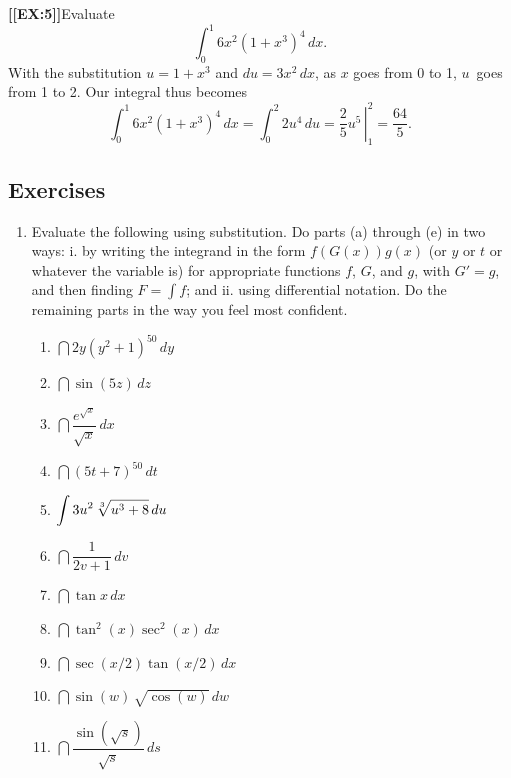 {\bf [[EX:5]]}\quad Evaluate
\[
\int_0^1 6 x^2(1+x^3)^4\,dx.
\]
With the substitution $u=1+x^3$ and $du=3x^2\,dx$, as $x$ goes from 0
to 1, $u$~goes from 1 to 2. Our integral thus becomes
\[
\int_0^1 6 x^2(1+x^3)^4\,dx=\int_0^2 2 u^4\,du
   =\left. \dfrac{2}{5}u^5 \, \right|_1^2 =\dfrac{64}{5}.
\]

\subsection{Exercises}
\label{subsec:exercises}




\begin{enumerate}
\item Evaluate the following using substitution.  Do parts (a) through
(e) in two ways: {\rm i.}  by writing the integrand in the form
$f(G(x))g(x)$ (or $y$ or $t$ or whatever the variable is) for
appropriate functions $f$, $G$, and $g$, with $G'=g$, and then finding
$F = \int f$; and {\rm ii.} using differential notation.  Do the
remaining parts in the way you feel most confident.



  \begin{enumerate}
  \item ${\dint 2y(y^2+1)^{50}\,dy}$


  \item ${\dint \sin(5z)\,dz}$


  \item ${\dint \dfrac{e^{\sqrt x}}{\sqrt x}\,dx}$


  \item ${\dint (5t+7)^{50}\,dt}$


  \item ${\dint 3u^2 \, \root 3 \of {u^3+8}\,du}$


  \item ${\dint \dfrac{1}{2v+1}\,dv}$


  \item ${\dint \tan{x}\,dx}$


  \item ${\dint \tan^2(x)\sec^2(x)\,dx}$


  \item ${\dint \sec(x/2)\tan(x/2)\,dx}$

  \item ${\dint \sin(w)\,\sqrt{\cos(w)}\,dw}$


  \item ${\dint \dfrac{\sin(\sqrt{s})}{\sqrt{s}}\,ds}$



\end{enumerate}
\end{enumerate}
